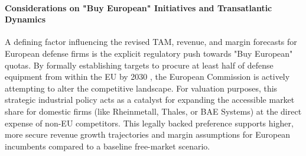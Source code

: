 \paragraph{Considerations on "Buy European" Initiatives and Transatlantic Dynamics} \label{par:defense_buy_european}
A defining factor influencing the revised TAM, revenue, and margin forecasts for European defense firms is the explicit regulatory push towards "Buy European" quotas. By formally establishing targets to procure at least half of defense equipment from within the EU by 2030 \parencite{ec2024edis}, the European Commission is actively attempting to alter the competitive landscape. For valuation purposes, this strategic industrial policy acts as a catalyst for expanding the accessible market share for domestic firms (like Rheinmetall, Thales, or BAE Systems) at the direct expense of non-EU competitors. This legally backed preference supports higher, more secure revenue growth trajectories and margin assumptions for European incumbents compared to a baseline free-market scenario.

